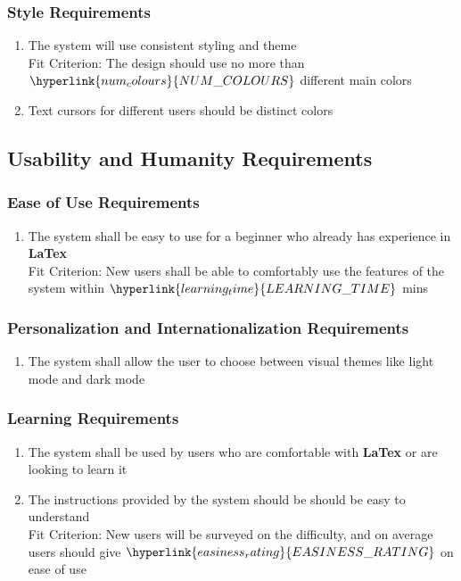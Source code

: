 \documentclass[12pt, titlepage]{article}
\begin{document}
	\subsubsection{Style Requirements}
	\begin{enumerate}[resume*]
		\item The system will use consistent styling and theme\\
		{\color{red}Fit Criterion: The design should use no more than $\hyperlink{num_colours}{NUM\_COLOURS}$ different main colors}
		\item Text cursors for different users should be distinct colors
	\end{enumerate}
	\subsection{Usability and Humanity Requirements}
	\subsubsection{Ease of Use Requirements}
	\begin{enumerate}[resume*]
		\item The system shall be easy to use for a beginner who already has experience in \textbf{LaTex}\\
		{\color{red}Fit Criterion: New users shall be able to comfortably use the features of the system within $\hyperlink{learning_time}{LEARNING\_TIME}$  mins}
	\end{enumerate}
	\subsubsection{Personalization and Internationalization Requirements}
	\begin{enumerate}[resume*]
		\item The system shall allow the user to choose between visual themes like light mode and dark mode
	\end{enumerate}
	\subsubsection{Learning Requirements}
	\begin{enumerate}[resume*]
		\item The system shall be used by users who are comfortable with \textbf{LaTex} or are looking to learn it
		\item The instructions provided by the system should be should be easy to understand\\
		{\color{red}Fit Criterion: New users will be surveyed on the difficulty, and on average users should give $\hyperlink{easiness_rating}{EASINESS\_RATING}$ on ease of use}
	\end{enumerate}
\end{document}
